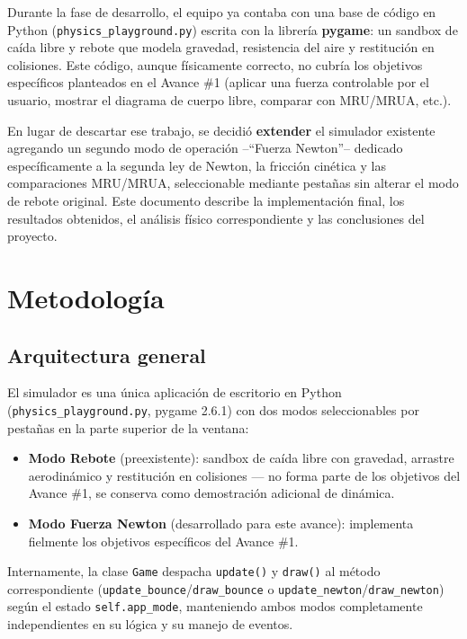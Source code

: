 \documentclass[12pt,letterpaper]{article}
\begin{document}
Durante la fase de desarrollo, el equipo ya contaba con una base de código en Python (\texttt{physics\_playground.py}) escrita con la librería \textbf{pygame}: un sandbox de caída libre y rebote que modela gravedad, resistencia del aire y restitución en colisiones. Este código, aunque físicamente correcto, no cubría los objetivos específicos planteados en el Avance \#1 (aplicar una fuerza controlable por el usuario, mostrar el diagrama de cuerpo libre, comparar con MRU/MRUA, etc.).

En lugar de descartar ese trabajo, se decidió \textbf{extender} el simulador existente agregando un segundo modo de operación --``Fuerza Newton''-- dedicado específicamente a la segunda ley de Newton, la fricción cinética y las comparaciones MRU/MRUA, seleccionable mediante pestañas sin alterar el modo de rebote original. Este documento describe la implementación final, los resultados obtenidos, el análisis físico correspondiente y las conclusiones del proyecto.

\section{Metodología}

\subsection{Arquitectura general}

El simulador es una única aplicación de escritorio en Python (\texttt{physics\_playground.py}, pygame 2.6.1) con dos modos seleccionables por pestañas en la parte superior de la ventana:

\begin{itemize}[leftmargin=1.5em]
  \item \textbf{Modo Rebote} (preexistente): sandbox de caída libre con gravedad, arrastre aerodinámico y restitución en colisiones --- no forma parte de los objetivos del Avance \#1, se conserva como demostración adicional de dinámica.
  \item \textbf{Modo Fuerza Newton} (desarrollado para este avance): implementa fielmente los objetivos específicos del Avance \#1.
\end{itemize}

Internamente, la clase \texttt{Game} despacha \texttt{update()} y \texttt{draw()} al método correspondiente (\texttt{update\_bounce}/\texttt{draw\_bounce} o \texttt{update\_newton}/\texttt{draw\_newton}) según el estado \texttt{self.app\_mode}, manteniendo ambos modos completamente independientes en su lógica y su manejo de eventos.
\end{document}
